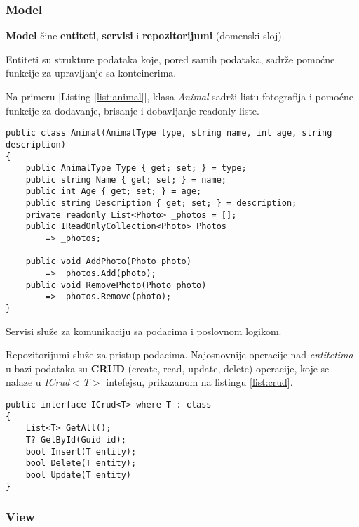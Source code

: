 \subsubsection*{Model}
\par \textbf{Model} čine \textbf{entiteti}, \textbf{servisi} i \textbf{repozitorijumi} (domenski sloj). 
\par Entiteti su strukture podataka koje, pored samih podataka, sadrže pomoćne funkcije za upravljanje sa konteinerima. 
\par Na primeru [Listing \ref{list:animal}], klasa \textit{Animal} sadrži listu fotografija i pomoćne funkcije za dodavanje, brisanje i dobavljanje
readonly liste.
\begin{lstlisting}[caption={Primer entiteta}, captionpos=b, label=list:animal]
public class Animal(AnimalType type, string name, int age, string description)
{
    public AnimalType Type { get; set; } = type;
    public string Name { get; set; } = name;
    public int Age { get; set; } = age;
    public string Description { get; set; } = description;
    private readonly List<Photo> _photos = [];
    public IReadOnlyCollection<Photo> Photos 
        => _photos;

    public void AddPhoto(Photo photo) 
        => _photos.Add(photo);
    public void RemovePhoto(Photo photo) 
        => _photos.Remove(photo);
}
\end{lstlisting}
\par Servisi služe za komunikaciju sa podacima i poslovnom logikom. 
\par Repozitorijumi služe za pristup podacima. Najosnovnije operacije nad \textit{entitetima} u bazi podataka su \textbf{CRUD} (create, read, update, delete) 
operacije, koje se nalaze u \textit{ICrud$<$T$>$} intefejsu, prikazanom na listingu \ref{list:crud}.
\begin{lstlisting}[caption={ICrud$<$T$>$ interfejs}, captionpos=b, label={list:crud}]
public interface ICrud<T> where T : class
{
    List<T> GetAll();
    T? GetById(Guid id);
    bool Insert(T entity);
    bool Delete(T entity);
    bool Update(T entity)
}
\end{lstlisting}
\subsubsection*{View}
